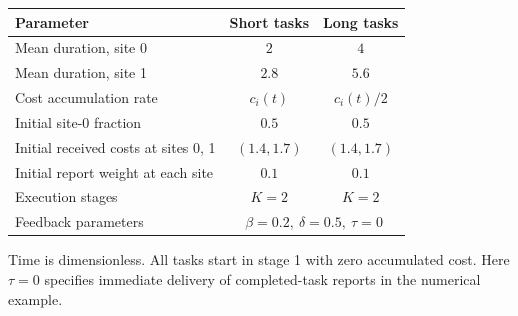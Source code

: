 \par\medskip\Needspace{174pt}
\noindent\begin{minipage}{\textwidth}
\centering\footnotesize\setlength{\tabcolsep}{3pt}\renewcommand{\arraystretch}{1.13}
\label{tab:design}
\begin{tabular*}{\textwidth}{@{\extracolsep{\fill}}lcc@{}}
\toprule
Parameter & Short tasks & Long tasks\\
\midrule
Mean duration, site 0 & $2$ & $4$\\
Mean duration, site 1 & $2.8$ & $5.6$\\
Cost accumulation rate & $c_i(t)$ & $c_i(t)/2$\\
Initial site-0 fraction & $0.5$ & $0.5$\\
Initial received costs at sites 0, 1 & $(1.4,1.7)$ & $(1.4,1.7)$\\
Initial report weight at each site & $0.1$ & $0.1$\\
Execution stages & $K=2$ & $K=2$\\
Feedback parameters & \multicolumn{2}{c}{$\beta=0.2,\ \delta=0.5,\ \tau=0$}\\
\bottomrule\end{tabular*}
\par\smallskip\raggedright Time is dimensionless. All tasks start in stage 1 with zero accumulated cost. Here $\tau=0$ specifies immediate delivery of completed-task reports in the numerical example.
\end{minipage}\par\medskip
